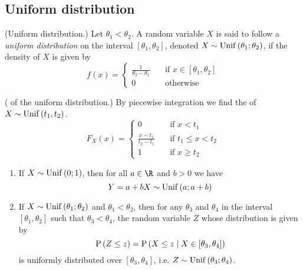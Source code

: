 \documentclass[11pt]{article}
\begin{document}
\subsection{Uniform distribution}

\begin{defn}{(Uniform distribution.)}
    \label{def:uniform}
    Let $\theta_1 < \theta_2$. A random variable $X$ is said to follow a
    \emph{uniform distribution} on the interval $[\theta_1, \theta_2]$, denoted
    $X \sim \operatorname{Unif}\left(\theta_1;\theta_2\right)$, if the density of $X$ is given by
    \begin{equation*}
        \label{eq:uniform}
        f(x) = \begin{cases}
            \frac{1}{\theta_2 - \theta_1}
                &\quad\text{if } x \in [\theta_1,\theta_2] \\
            0
                &\quad\text{otherwise}
        \end{cases}
    \end{equation*}
\end{defn}

\begin{rem}{(\Cdf{} of the uniform distribution.)}
    \label{rem:cdf-uniform}
    By piecewise integration we find the \cdf{} of $X \sim \operatorname{Unif}\left(t_1, t_2\right)$.
    \begin{equation*}
        \label{eq:cdf-uniform}
        F_X(x) = \begin{cases}
            0
                &\quad\text{if } x < t_1 \\
            \frac{x-t_1}{t_2 - t_1}
                &\quad\text{if } t_1 \leq x < t_2 \\
            1
                &\quad\text{if } x \geq t_2
        \end{cases}
    \end{equation*}
\end{rem}

\begin{thm}
    \label{thm:properties-uniform}
    \begin{enumerate}
        \item
            If $X \sim \operatorname{Unif}\left(0;1\right)$,
            then for all $a \in \R$ and $b > 0$ we have
            \begin{equation*}
                Y = a + bX \sim \operatorname{Unif}\left(a;a+b\right)
            \end{equation*}
        \item
            If $X \sim \operatorname{Unif}\left(\theta_1; \theta_2\right)$ and $\theta_1 < \theta_2$,
            then for any $\theta_3$ and $\theta_4$ in the interval
            $[\theta_1,\theta_2]$ such that $\theta_3 < \theta_4$,
            the random variable $Z$ whose distribution is given by
            \begin{equation*}
                \operatorname{P}{\left(Z \leq z\right)} = \operatorname{P}{\left(X \leq z \;\vert\; X \in [\theta_3, \theta_4]\right)}
            \end{equation*}
            is uniformly distributed over $[\theta_3, \theta_4]$,
            i.e. $Z \sim \operatorname{Unif}\left(\theta_3; \theta_4\right)$.
    \end{enumerate}
\end{thm}
\end{document}

